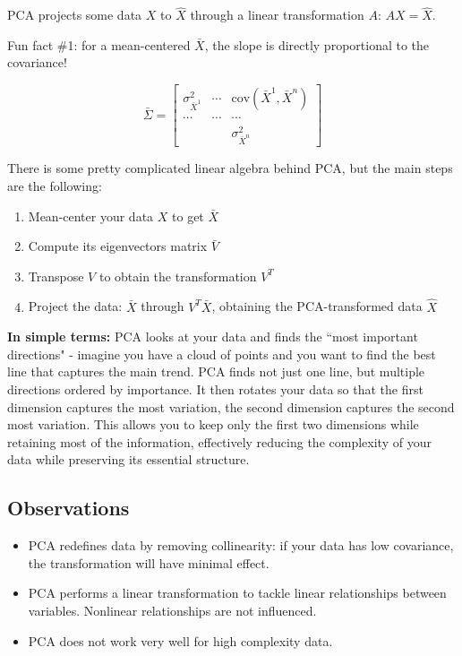 
PCA projects some data $X$ to $\hat{X}$ through a linear transformation $A$: $AX = \hat{X}$.

Fun fact \#1: for a mean-centered $\bar{X}$, the slope is directly proportional to the covariance!

\[
\bar{\Sigma} = \begin{bmatrix}
\sigma_{\bar{X}^1}^2 & \cdots & \text{cov}(\bar{X}^1, \bar{X}^n) \\
\cdots & \cdots & \cdots \\
& & \sigma_{\bar{X}^n}^2
\end{bmatrix}
\]



There is some pretty complicated linear algebra behind PCA, but the main steps are the following:
\begin{enumerate}
   \item Mean-center your data $X$ to get $\bar{X}$
   \item Compute its eigenvectors matrix $\bar{V}$
   \item Transpose $V$ to obtain the transformation $V^T$
   \item Project the data: $\bar{X}$ through $V^T\bar{X}$, obtaining the PCA-transformed data $\hat{X}$ 
\end{enumerate}

\textbf{In simple terms:} PCA looks at your data and finds the ``most important directions" - imagine you have a cloud of points and you want to find the best line that captures the main trend. PCA finds not just one line, but multiple directions ordered by importance. It then rotates your data so that the first dimension captures the most variation, the second dimension captures the second most variation. This allows you to keep only the first two dimensions while retaining most of the information, effectively reducing the complexity of your data while preserving its essential structure.

\subsection{Observations}
\begin{itemize}
	\item PCA redefines data by removing
collinearity: if your data has low
covariance, the transformation will
have minimal effect.
	\item PCA performs a linear
transformation to tackle linear
relationships between variables.
Nonlinear relationships are not
influenced.
   \item PCA does not work very well for high complexity data.
\end{itemize}

